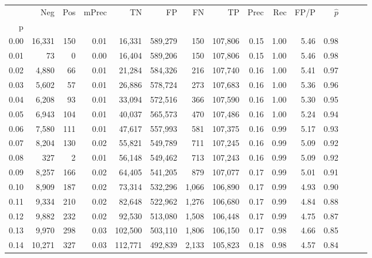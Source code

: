 \begin{tabular}{rrrrrrrrrrrrrrr}
\toprule
{} &     Neg &    Pos & mPrec &       TN &       FP &       FN &       TP &  Prec &   Rec &  FP/P & $\hat{p}$ \\
p    &         &        &       &          &          &          &          &       &       &       &           \\
\midrule
0.00 &  16,331 &    150 &  0.01 &   16,331 &  589,279 &      150 &  107,806 &  0.15 &  1.00 &  5.46 &      0.98 \\
0.01 &      73 &      0 &  0.00 &   16,404 &  589,206 &      150 &  107,806 &  0.15 &  1.00 &  5.46 &      0.98 \\
0.02 &   4,880 &     66 &  0.01 &   21,284 &  584,326 &      216 &  107,740 &  0.16 &  1.00 &  5.41 &      0.97 \\
0.03 &   5,602 &     57 &  0.01 &   26,886 &  578,724 &      273 &  107,683 &  0.16 &  1.00 &  5.36 &      0.96 \\
0.04 &   6,208 &     93 &  0.01 &   33,094 &  572,516 &      366 &  107,590 &  0.16 &  1.00 &  5.30 &      0.95 \\
0.05 &   6,943 &    104 &  0.01 &   40,037 &  565,573 &      470 &  107,486 &  0.16 &  1.00 &  5.24 &      0.94 \\
0.06 &   7,580 &    111 &  0.01 &   47,617 &  557,993 &      581 &  107,375 &  0.16 &  0.99 &  5.17 &      0.93 \\
0.07 &   8,204 &    130 &  0.02 &   55,821 &  549,789 &      711 &  107,245 &  0.16 &  0.99 &  5.09 &      0.92 \\
0.08 &     327 &      2 &  0.01 &   56,148 &  549,462 &      713 &  107,243 &  0.16 &  0.99 &  5.09 &      0.92 \\
0.09 &   8,257 &    166 &  0.02 &   64,405 &  541,205 &      879 &  107,077 &  0.17 &  0.99 &  5.01 &      0.91 \\
0.10 &   8,909 &    187 &  0.02 &   73,314 &  532,296 &    1,066 &  106,890 &  0.17 &  0.99 &  4.93 &      0.90 \\
0.11 &   9,334 &    210 &  0.02 &   82,648 &  522,962 &    1,276 &  106,680 &  0.17 &  0.99 &  4.84 &      0.88 \\
0.12 &   9,882 &    232 &  0.02 &   92,530 &  513,080 &    1,508 &  106,448 &  0.17 &  0.99 &  4.75 &      0.87 \\
0.13 &   9,970 &    298 &  0.03 &  102,500 &  503,110 &    1,806 &  106,150 &  0.17 &  0.98 &  4.66 &      0.85 \\
0.14 &  10,271 &    327 &  0.03 &  112,771 &  492,839 &    2,133 &  105,823 &  0.18 &  0.98 &  4.57 &      0.84 \\

\end{tabular}
